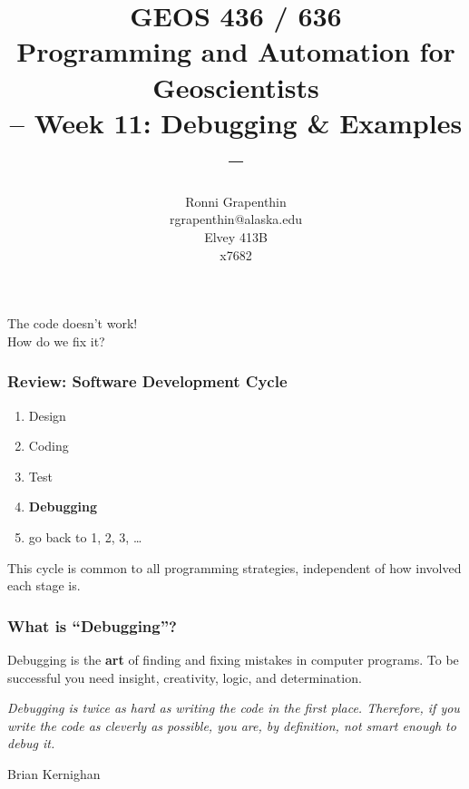 \documentclass[unknownkeysallowed]{beamer}
\title[PAG]%
{GEOS 436 / 636\\
Programming and Automation for Geoscientists\\[20pt]
-- Week 11: Debugging \& Examples --
}
\author[Grapenthin]%
{Ronni Grapenthin\\
rgrapenthin@alaska.edu\\
Elvey 413B\\
x7682}
\institute[UAF] %
{}
\date[]{}
\begin{document}
\lstset{numbers=left, numberstyle=\tiny, stepnumber=2, basicstyle=\ttfamily, numbersep=5pt, xleftmargin=10pt}


	\begin{frame}
	\begin{center}
		\titlepage
	\end{center}
	\end{frame}


\begin{frame}
\frametitle{}
	\begin{center}
	The code doesn't work!\\[10pt]
	How do we fix it?
	\end{center}
\end{frame}

\begin{frame}
	\frametitle{Review: Software Development Cycle}
	\begin{enumerate}
		\item Design
		\item Coding
		\item Test
		\item {\bf Debugging}
		\item go back to 1, 2, 3, \dots
	\end{enumerate}
	\begin{center}	
	This cycle is common to all programming strategies, independent of how involved each stage is. 
	\end{center}	
\end{frame}

\begin{frame}
	\frametitle{What is ``Debugging''?}
	\begin{block}{}
	Debugging is the {\bf art} of finding and fixing mistakes in computer
	programs. To be successful you need insight, creativity, logic, and
	determination.
	\end{block}

	\begin{block}{}
	\emph{Debugging is twice as hard as writing the code in the first
	place. Therefore, if you write the code as cleverly as possible,
	you are, by definition, not smart enough to debug it.
	}
	\begin{flushleft}
	\tiny{Brian Kernighan}
	\end{flushleft}	
	\end{block}

\end{frame}
\end{document}
